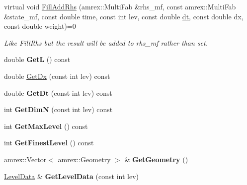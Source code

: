 \begin{DoxyCompactItemize}
virtual void \mbox{\hyperlink{classsledgehamr_1_1Sledgehamr_a61bd3ef11742f97b3588aded1c21a688}{Fill\+Add\+Rhs}} (amrex\+::\+Multi\+Fab \&rhs\+\_\+mf, const amrex\+::\+Multi\+Fab \&state\+\_\+mf, const double time, const int lev, const double \mbox{\hyperlink{classsledgehamr_1_1Sledgehamr_a9239f0c77e572cc155e33f602c19b8dc}{dt}}, const double dx, const double weight)=0
\begin{DoxyCompactList}\small\item\em Like Fill\+Rhs but the result will be added to rhs\+\_\+mf rather than set. \end{DoxyCompactList}\item 
\mbox{\label{classsledgehamr_1_1Sledgehamr_a615719ce6ad99823f3007471a0401eee}} 
double {\bfseries GetL} () const
\item 
double \mbox{\hyperlink{classsledgehamr_1_1Sledgehamr_ae041be553a87d5da3eda5c6dc143c8b8}{Get\+Dx}} (const int lev) const
\item 
\mbox{\label{classsledgehamr_1_1Sledgehamr_ad0184437c39c28d57533f127ffb0f58d}} 
double {\bfseries Get\+Dt} (const int lev) const
\item 
\mbox{\label{classsledgehamr_1_1Sledgehamr_abc83d3b80945e15dcb9e68c4ec38da46}} 
int {\bfseries Get\+DimN} (const int lev) const
\item 
\mbox{\label{classsledgehamr_1_1Sledgehamr_a8233248303597d2e5e9945d5499c6dd6}} 
int {\bfseries Get\+Max\+Level} () const
\item 
\mbox{\label{classsledgehamr_1_1Sledgehamr_a4f26822420530e092da46245a25f2d84}} 
int {\bfseries Get\+Finest\+Level} () const
\item 
\mbox{\label{classsledgehamr_1_1Sledgehamr_aa9e307f7e4247731a24ca3dddb60e02c}} 
amrex\+::\+Vector$<$ amrex\+::\+Geometry $>$ \& {\bfseries Get\+Geometry} ()
\item 
\mbox{\label{classsledgehamr_1_1Sledgehamr_ac08726e6e883efe235b9f52d80535b5e}} 
\mbox{\hyperlink{classsledgehamr_1_1LevelData}{Level\+Data}} \& {\bfseries Get\+Level\+Data} (const int lev)

\end{DoxyCompactItemize}
